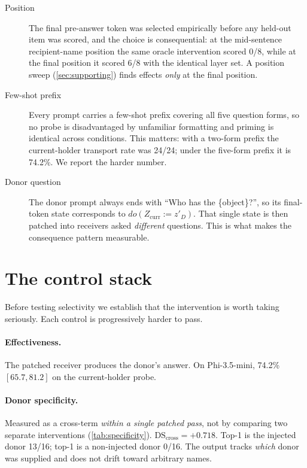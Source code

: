 \documentclass[11pt]{article}
\newcommand{\Zcurr}{\ensuremath{Z_{\mathrm{curr}}}}
\begin{document}
\begin{description}
  \item[Position] The final pre-answer token was selected empirically before
    any held-out item was scored, and the choice is consequential: at the
    mid-sentence recipient-name position the same oracle intervention scored
    0/8, while at the final position it scored 6/8 with the identical layer
    set. A position sweep (\cref{sec:supporting}) finds effects \emph{only} at
    the final position.
  \item[Few-shot prefix] Every prompt carries a few-shot prefix covering all
    five question forms, so no probe is disadvantaged by unfamiliar formatting
    and priming is identical across conditions. This matters: with a two-form
    prefix the current-holder transport rate was 24/24; under the five-form
    prefix it is 74.2\%. We report the harder number.
  \item[Donor question] The donor prompt always ends with \enquote{Who has the
    \{object\}?}, so its final-token state corresponds to
    $do(\Zcurr := z'_D)$. That single state is then patched into receivers
    asked \emph{different} questions. This is what makes the consequence
    pattern measurable.
\end{description}

\section{The control stack}
\label{sec:controls}

Before testing selectivity we establish that the intervention is worth taking
seriously. Each control is progressively harder to pass.

\paragraph{Effectiveness.}
The patched receiver produces the donor's answer. On Phi-3.5-mini, 74.2\%
$[65.7, 81.2]$ on the current-holder probe.

\paragraph{Donor specificity.}
Measured as a cross-term \emph{within a single patched pass}, not by comparing
two separate interventions (\cref{tab:specificity}). $\mathrm{DS_{cross}} =
+0.718$. Top-1 is the injected donor 13/16; top-1 is a non-injected donor
0/16. The output tracks \emph{which} donor was supplied and does not drift
toward arbitrary names.
\end{document}
